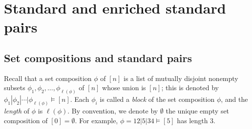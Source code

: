 \documentclass[11pt]{amsart}
\numberwithin{equation}{section}
\newcommand{\NCQSym}{\mathrm{NCQSym}}
\newcommand{\NCSym}{\mathrm{NCSym}}
\newcommand{\bx}{{\bf x}}
\newcommand{\FA}[1]{\textcolor{red}{#1}}
\begin{document}
%			
%
%
%
%
%
%
%



\section{Standard and enriched standard pairs}\label{sec:sten}

\subsection{Set compositions and standard pairs}
Recall that a {set composition} $\phi$ of $[n]$ is a list  of mutually disjoint  nonempty subsets  $\phi_1,\phi_2,\ldots,\phi_{\ell(\phi)}$ of $[n]$ whose union is $[n]$; this is denoted by $\phi_1|\phi_2|\cdots|\phi_{\ell(\phi)}\vDash [n]$.
 Each $\phi_i$ is called a \emph{block} of the set composition $\phi$, and the \emph{length} of $\phi$ is $\ell(\phi)$.  By convention, we denote by $\emptyset$ the unique empty set composition of $[0]=\emptyset$.  For example, $\phi=12|5|34\vDash [5]$ has length 3.
\end{document}
